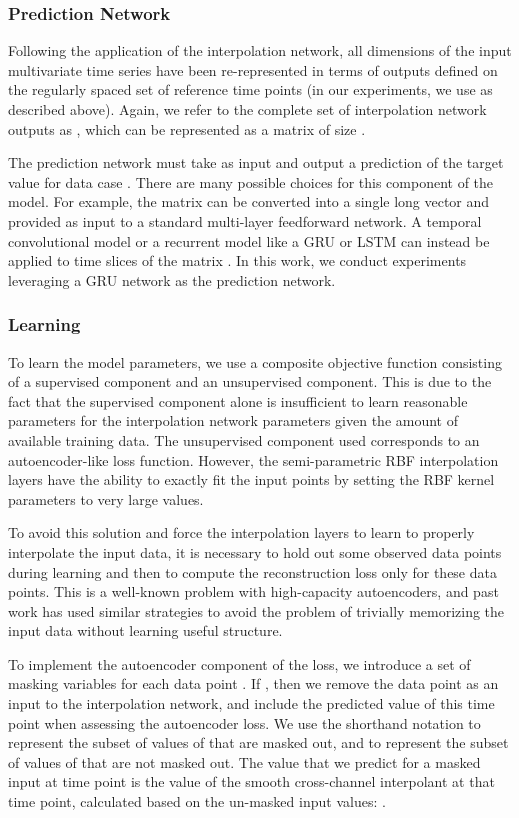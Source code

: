 \documentclass{article} \usepackage{iclr2019_conference,times}
\begin{document}
\subsubsection{Prediction Network} Following the application of the 
interpolation network, all  dimensions of the input multivariate time series have been
re-represented in terms of  outputs defined on the regularly spaced 
set of reference time points  (in our
experiments, we use  as described above).
Again, we refer to the complete set of interpolation network outputs 
as , which can be represented as a matrix
of size . 

The prediction network must take  as input and
output a prediction  of the target value 
for data case . There are many possible choices for this
component of the model. For example, the matrix  
can be converted into a single long vector and provided as 
input to a standard multi-layer feedforward network. 
A temporal convolutional model or a recurrent model like a 
GRU or LSTM can instead be applied to time slices of the 
matrix . In this work, we conduct experiments
leveraging a GRU network as the prediction network.

\subsubsection{Learning} To learn the model parameters, we use a 
composite objective function consisting of a supervised component
and an unsupervised component. This is due to the fact that the 
supervised component alone is insufficient to learn reasonable
parameters for the interpolation network parameters given the amount
of available training data. The unsupervised component used 
corresponds to an autoencoder-like loss function. However,
the semi-parametric RBF interpolation layers have the ability to
exactly fit the input points by setting the RBF kernel parameters
to very large values. 

To avoid this solution and force the interpolation
layers to learn to properly interpolate the input data, it is necessary
to hold out some observed data points  during learning and then
to compute the reconstruction loss only for these data points. This is a 
well-known problem with high-capacity autoencoders, and past work 
has used similar strategies to avoid the problem of trivially 
memorizing the input data without learning useful structure.

To implement the autoencoder component of the loss, we introduce
a set of masking variables  for each data point .
If , then we remove the data point  as an input
to the interpolation network, and include the predicted value of this time point
when assessing the autoencoder loss. We use the shorthand notation  to represent
the subset of values of  that are masked out, and 
to represent the subset of values of  that are not masked out. 
The value  that we predict for a masked input at time  
point  is the value of the smooth cross-channel interpolant at that time point, calculated
based on the un-masked input values: .
\end{document}
